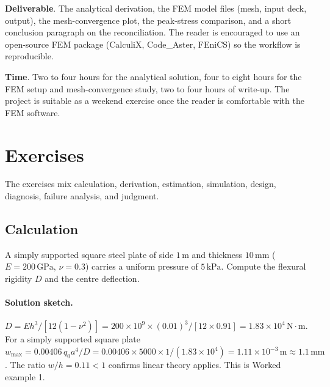 \begin{project}
\textbf{Deliverable}. The analytical derivation, the FEM model
files (mesh, input deck, output), the mesh-convergence plot, the
peak-stress comparison, and a short conclusion paragraph on the
reconciliation. The reader is encouraged to use an open-source
FEM package (CalculiX, Code\_Aster, FEniCS) so the workflow is
reproducible.

\textbf{Time}. Two to four hours for the analytical solution,
four to eight hours for the FEM setup and mesh-convergence study,
two to four hours of write-up. The project is suitable as a
weekend exercise once the reader is comfortable with the FEM
software.
\end{project}

\section{Exercises}

The exercises mix calculation, derivation, estimation, simulation,
design, diagnosis, failure analysis, and judgment.

\subsection*{Calculation}

\begin{exercise}
A simply supported square steel plate of side $1\,\si{\meter}$ and
thickness $10\,\si{\milli\meter}$ ($E = 200\,\text{GPa}$, $\nu =
0.3$) carries a uniform pressure of $5\,\text{kPa}$. Compute the
flexural rigidity $D$ and the centre deflection.

\paragraph{Solution sketch.} $D = Eh^3/[12(1-\nu^2)] = 200\times 10^9
\times (0.01)^3/[12\times 0.91] = 1.83\times 10^4\,\text{N}\cdot\text{m}$.
For a simply supported square plate $w_{\max} = 0.00406\, q_0 a^4/D =
0.00406\times 5000\times 1/(1.83\times 10^4) = 1.11\times 10^{-3}\,
\text{m} \approx 1.1\,\si{\milli\meter}$. The ratio $w/h = 0.11 < 1$
confirms linear theory applies. This is Worked example 1.
\end{exercise}


